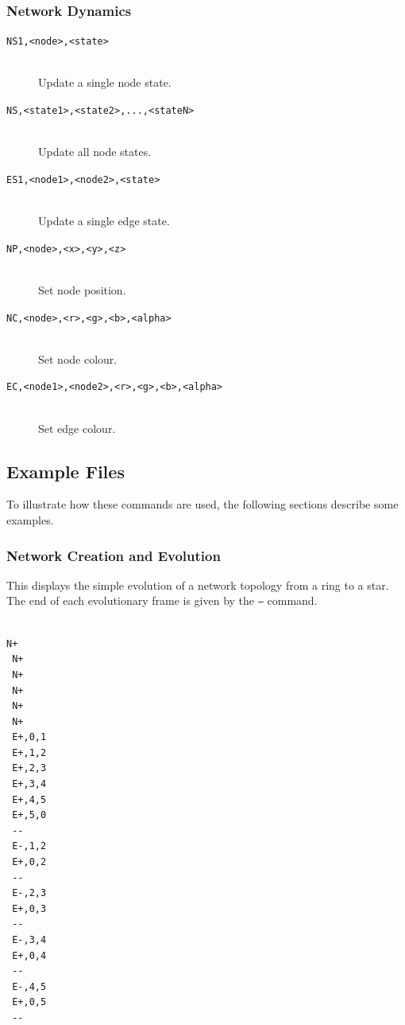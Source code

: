 \documentclass[a4paper, 11pt]{article}
\begin{document}
\subsubsection{Network Dynamics}
\begin{description}
\item[\small\texttt{NS1,<node>,<state>}] ~\\Update a single node state.

\item[\small\texttt{NS,<state1>,<state2>,...,<stateN>}] ~\\Update all node states.

\item[\small\texttt{ES1,<node1>,<node2>,<state>}] ~\\Update a single edge state.

\item[\small\texttt{NP,<node>,<x>,<y>,<z>}] ~\\Set node position.

\item[\small\texttt{NC,<node>,<r>,<g>,<b>,<alpha>}] ~\\Set node colour.

\item[\small\texttt{EC,<node1>,<node2>,<r>,<g>,<b>,<alpha>}] ~\\Set edge colour.
\end{description}

\subsection{Example Files}

To illustrate how these commands are used, the following sections describe some examples.

\subsubsection{Network Creation and Evolution}
This displays the simple evolution of a network topology from a ring to a star. The end of each evolutionary frame is given by the \texttt{--} command.\\~\\

\begin{Verbatim}[fontsize=\relsize{-1.2},frame=single,commandchars=\\\{\}]
 N+
 N+
 N+
 N+
 N+
 N+
 E+,0,1
 E+,1,2
 E+,2,3
 E+,3,4
 E+,4,5
 E+,5,0
 --
 E-,1,2
 E+,0,2
 --
 E-,2,3
 E+,0,3
 --
 E-,3,4
 E+,0,4
 --
 E-,4,5
 E+,0,5
 --
\end{Verbatim}
\end{document}
